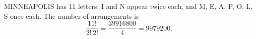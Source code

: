 MINNEAPOLIS has $11$ letters: I and N appear twice each, and M, E, A, P, O, L, S once each. The number of arrangements is
\[\dfrac{11!}{2!\,2!}=\dfrac{39916800}{4}=\boxed{9979200}.\]
